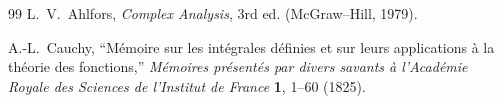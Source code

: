\documentclass[11pt]{article}
\begin{document}
\begin{thebibliography}{99}
            L.~V.~Ahlfors,
            \emph{Complex Analysis}, 3rd ed.
            (McGraw--Hill, 1979).

            A.-L.~Cauchy,
            ``M\'emoire sur les int\'egrales d\'efinies et sur leurs applications \`a la th\'eorie des fonctions,''
            \emph{M\'emoires pr\'esent\'es par divers savants \`a l'Acad\'emie Royale des Sciences de l'Institut de France} \textbf{1}, 1--60 (1825).

        \end{thebibliography}
\end{document}
